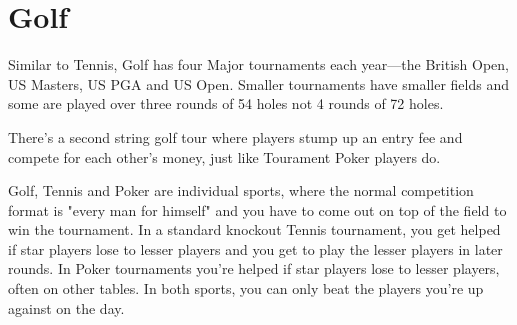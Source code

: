 \section{Golf}

Similar to Tennis, Golf has four Major tournaments each
year---the British Open, US Masters, US PGA and US Open. Smaller
tournaments have smaller fields and some are played over 
three rounds of 54 holes not 4 rounds of 72 holes.

There's a second string golf tour where players stump up an
entry fee and compete for each other's money, just like
Tourament Poker players do.

Golf, Tennis and Poker are individual sports, where
the normal competition format is "every man for himself" and
you have to come out on top of the field to win the tournament.
In a standard knockout Tennis tournament, you get helped
if star players lose to lesser players and you get to play the
lesser players in later rounds. In Poker tournaments you're
helped if star players lose to lesser players, often on other
tables. In both sports, you can only beat the players you're
up against on the day.
